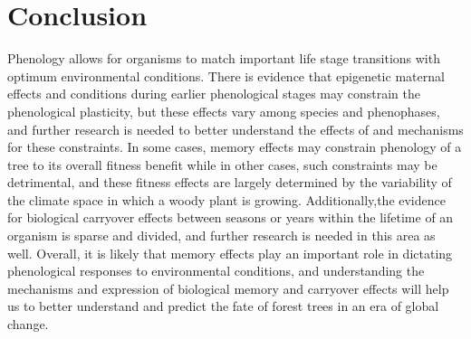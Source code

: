 \documentclass{article}\usepackage[]{graphicx}\usepackage[]{color}
\begin{document}
\section*{Conclusion}
\par Phenology allows for organisms to match important life stage transitions with optimum environmental conditions. There is evidence that epigenetic maternal effects and conditions during earlier phenological stages may constrain the phenological plasticity, but these effects vary among species and phenophases, and further research is needed to better understand the effects of and mechanisms for these constraints. In some cases, memory effects may constrain phenology of a tree to its overall fitness benefit while in other cases, such constraints may be detrimental, and these fitness effects are largely determined by the variability of the climate space in which a woody plant is growing. Additionally,the evidence for biological carryover effects between seasons or years within the lifetime of an organism is sparse and divided, and further research is needed in this area as well. Overall, it is likely that memory effects play an important role in dictating phenological responses to environmental conditions, and understanding the mechanisms and expression of biological memory and carryover effects will help us to better understand and predict the fate of forest trees in an era of global change. 



\end{document}
